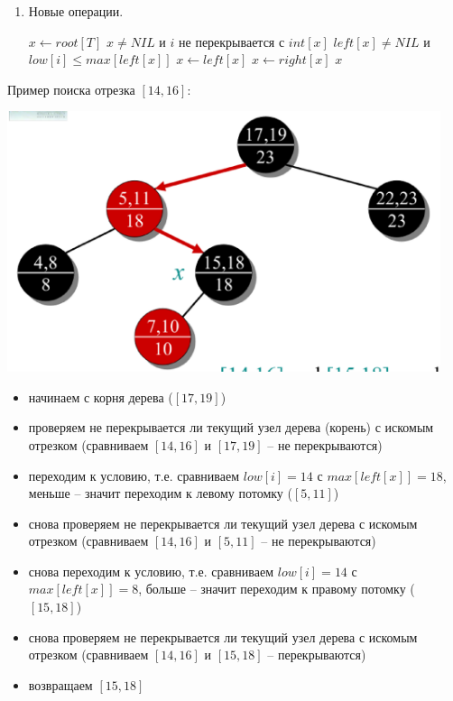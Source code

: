 \documentclass[a4paper,11pt]{article}
\begin{document}
\begin{enumerate}
  
\item Новые операции.
 
\begin{codebox}
\li $x \gets root[T]$
\li \While $x \neq NIL$ и $i$ не перекрывается с $int[x]$
\li \Do \If $left[x] \neq NIL$ и $ low[i] \leq max[left[x]]$
\li \Then $x \gets left[x]$
\li \Else $x \gets right[x]$
\End
\End
\li \Return $x$
\end{codebox}

\end{enumerate}

Пример поиска отрезка $[14, 16]$:

\begin{center}
  \includegraphics[width=5in]{lecture11/interval-search.eps}
\end{center}

\begin{itemize}
  
\item начинаем с корня дерева ($[17, 19]$)
\item проверяем не перекрывается ли текущий узел дерева (корень) с искомым
  отрезком (сравниваем $[14, 16]$ и $[17, 19]$ -- не перекрываются)
\item переходим к условию, т.е. сравниваем $low[i] = 14$ с $max[left[x]] =
  18$, меньше -- значит переходим к левому потомку ($[5, 11]$)
\item снова проверяем не перекрывается ли текущий узел дерева с искомым
  отрезком (сравниваем $[14, 16]$ и $[5, 11]$ -- не перекрываются)
\item снова переходим к условию, т.е. сравниваем $low[i] = 14$ с $max[left[x]] =
  8$, больше -- значит переходим к правому потомку ($[15, 18]$)
\item снова проверяем не перекрывается ли текущий узел дерева с искомым
  отрезком (сравниваем $[14, 16]$ и $[15, 18]$ -- перекрываются)
\item возвращаем $[15, 18]$
  
\end{itemize}
\end{document}
